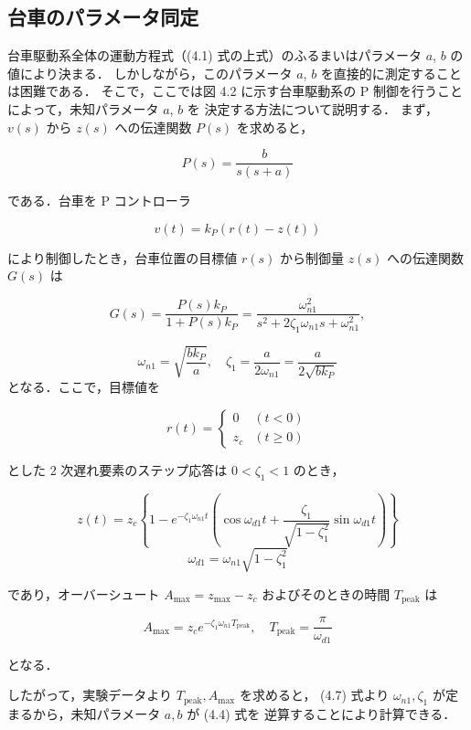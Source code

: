 \subsection{台車のパラメータ同定}

台車駆動系全体の運動方程式（(4.1) 式の上式）のふるまいはパラメータ \(a\), \(b\) の値により決まる．
しかしながら，このパラメータ \(a\), \(b\) を直接的に測定することは困難である．
そこで，ここでは図 4.2 に示す台車駆動系の P 制御を行うことによって，未知パラメータ \(a\), \(b\) を
決定する方法について説明する．
まず，\( v(s) \) から \( z(s) \) への伝達関数 \( P(s) \) を求めると，

\[
  P(s) = \frac{b}{s(s + a)} \tag{4.2}
\]

である．台車を P コントローラ

\[
  v(t) = k_P \left( r(t) - z(t) \right) \tag{4.3}
\]

により制御したとき，台車位置の目標値 \( r(s) \) から制御量 \( z(s) \) への伝達関数 \( G(s) \) は

\[
  G(s) = \frac{P(s)k_P}{1 + P(s)k_P} = \frac{\omega_{n1}^2}{s^2 + 2\zeta_1 \omega_{n1} s + \omega_{n1}^2}, \tag{4.4}
\]

\[
  \omega_{n1} = \sqrt{\frac{b k_P}{a}}, \quad \zeta_1 = \frac{a}{2\omega_{n1}} = \frac{a}{2\sqrt{b k_P}}
\]
となる．ここで，目標値を

\[
  r(t) = 
  \begin{cases}
    0   & (t < 0)    \\
    z_c & (t \geq 0)
  \end{cases} \tag{4.5}
\]

とした 2 次遅れ要素のステップ応答は \(0 < \zeta_1 < 1\) のとき，

\[
  z(t) = z_c \left\{ 1 - e^{-\zeta_1 \omega_{n1} t}
  \left( \cos \omega_{d1} t + \frac{\zeta_1}{\sqrt{1 - \zeta_1^2}} \sin \omega_{d1} t \right) \right\} \tag{4.6}
\]
\[
  \omega_{d1} = \omega_{n1} \sqrt{1 - \zeta_1^2}
\]

であり，オーバーシュート \( A_{\text{max}} = z_{\text{max}} - z_c \) およびそのときの時間 \( T_{\text{peak}} \) は

\[
  A_{\text{max}} = z_c e^{-\zeta_1 \omega_{n1} T_{\text{peak}}}, \quad T_{\text{peak}} = \frac{\pi}{\omega_{d1}} \tag{4.7}
\]

となる．

したがって，実験データより \( T_{\text{peak}}, A_{\text{max}} \) を求めると，
(4.7) 式より \( \omega_{n1}, \zeta_1 \) が定まるから，未知パラメータ \( a, b \) が (4.4) 式を
逆算することにより計算できる．

